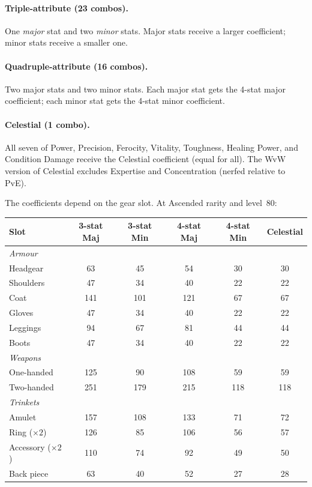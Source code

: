\documentclass[11pt, a4paper, oneside]{book}
\begin{document}
\paragraph{Triple-attribute (23 combos).}  One \emph{major} stat and two
\emph{minor} stats.  Major stats receive a larger coefficient; minor stats
receive a smaller one.

\paragraph{Quadruple-attribute (16 combos).}  Two major stats and two minor
stats.  Each major stat gets the 4-stat major coefficient; each minor stat gets
the 4-stat minor coefficient.

\paragraph{Celestial (1 combo).}  All seven of Power, Precision, Ferocity,
Vitality, Toughness, Healing Power, and Condition Damage receive the Celestial
coefficient (equal for all).  The WvW version of Celestial excludes Expertise
and Concentration (nerfed relative to PvE).

\medskip

The coefficients depend on the gear slot.  At Ascended rarity and level~80:

\begin{center}
\small
\begin{tabular}{lccccc}
\toprule
\textbf{Slot} & \textbf{3-stat Maj} & \textbf{3-stat Min} &
  \textbf{4-stat Maj} & \textbf{4-stat Min} & \textbf{Celestial} \\
\midrule
\multicolumn{6}{l}{\textit{Armour}} \\
\quad Headgear     & 63  & 45  & 54  & 30 & 30 \\
\quad Shoulders    & 47  & 34  & 40  & 22 & 22 \\
\quad Coat         & 141 & 101 & 121 & 67 & 67 \\
\quad Gloves       & 47  & 34  & 40  & 22 & 22 \\
\quad Leggings     & 94  & 67  & 81  & 44 & 44 \\
\quad Boots        & 47  & 34  & 40  & 22 & 22 \\
\midrule
\multicolumn{6}{l}{\textit{Weapons}} \\
\quad One-handed   & 125 & 90  & 108 & 59 & 59 \\
\quad Two-handed   & 251 & 179 & 215 & 118 & 118 \\
\midrule
\multicolumn{6}{l}{\textit{Trinkets}} \\
\quad Amulet       & 157 & 108 & 133 & 71 & 72 \\
\quad Ring ($\times 2$)  & 126 & 85  & 106 & 56 & 57 \\
\quad Accessory ($\times 2$) & 110 & 74 & 92 & 49 & 50 \\
\quad Back piece   & 63  & 40  & 52  & 27 & 28 \\
\bottomrule
\end{tabular}
\end{center}
\end{document}
